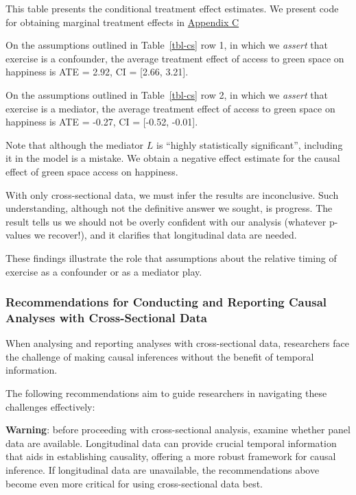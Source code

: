 \documentclass[
  singlecolumn]{article}
\begin{document}
This table presents the conditional treatment effect estimates. We
present code for obtaining marginal treatment effects in
\hyperref[appendix-c]{Appendix C}

On the assumptions outlined in Table~\ref{tbl-cs} row 1, in which we
\emph{assert} that exercise is a confounder, the average treatment
effect of access to green space on happiness is ATE = 2.92, CI =
{[}2.66, 3.21{]}.

On the assumptions outlined in Table~\ref{tbl-cs} row 2, in which we
\emph{assert} that exercise is a mediator, the average treatment effect
of access to green space on happiness is ATE = -0.27, CI = {[}-0.52,
-0.01{]}.

Note that although the mediator \(L\) is ``highly statistically
significant'', including it in the model is a mistake. We obtain a
negative effect estimate for the causal effect of green space access on
happiness.

With only cross-sectional data, we must infer the results are
inconclusive. Such understanding, although not the definitive answer we
sought, is progress. The result tells us we should not be overly
confident with our analysis (whatever p-values we recover!), and it
clarifies that longitudinal data are needed.

These findings illustrate the role that assumptions about the relative
timing of exercise as a confounder or as a mediator play.

\subsubsection{Recommendations for Conducting and Reporting Causal
Analyses with Cross-Sectional
Data}\label{recommendations-for-conducting-and-reporting-causal-analyses-with-cross-sectional-data}

When analysing and reporting analyses with cross-sectional data,
researchers face the challenge of making causal inferences without the
benefit of temporal information.

The following recommendations aim to guide researchers in navigating
these challenges effectively:

\textbf{Warning}: before proceeding with cross-sectional analysis,
examine whether panel data are available. Longitudinal data can provide
crucial temporal information that aids in establishing causality,
offering a more robust framework for causal inference. If longitudinal
data are unavailable, the recommendations above become even more
critical for using cross-sectional data best.
\end{document}
